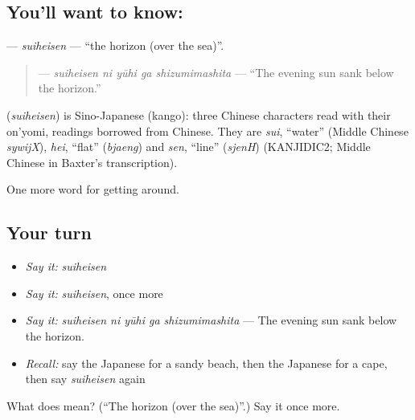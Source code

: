 \subsection*{You'll want to know: }
\textbf{} — \emph{suiheisen} — \textquotedblleft{}the horizon (over the sea)\textquotedblright{}.

\begin{quote}
\textbf{  } — \emph{suiheisen ni yūhi ga shizumimashita} — \textquotedblleft{}The evening sun sank below the horizon.\textquotedblright{}
\end{quote}

\begin{cousinweb}
\textbf{} (\emph{suiheisen}) is Sino-Japanese (kango): three Chinese characters read with their on'yomi, readings borrowed from Chinese. They are \emph{sui}, \textquotedblleft{}water\textquotedblright{} (Middle Chinese \emph{sywijX}), \emph{hei}, \textquotedblleft{}flat\textquotedblright{} (\emph{bjaeng}) and \emph{sen}, \textquotedblleft{}line\textquotedblright{} (\emph{sjenH}) (KANJIDIC2; Middle Chinese in Baxter's transcription).
\end{cousinweb}

\begin{grammarlens}[title={What you've built}]
One more word for getting around.
\end{grammarlens}

\subsection*{Your turn}
\begin{itemize}
\raggedright
  \item \emph{Say it:} \emph{suiheisen}
  \item \emph{Say it:} \emph{suiheisen}, once more
  \item \emph{Say it:} \emph{suiheisen ni yūhi ga shizumimashita} — The evening sun sank below the horizon.
  \item \emph{Recall:} say the Japanese for a sandy beach, then the Japanese for a cape, then say \emph{suiheisen} again
\end{itemize}

\begin{tcolorbox}[breakable,colback=teal!4,colframe=teal!35!black,title={Before you move on}]
What does  mean? (\textquotedblleft{}The horizon (over the sea)\textquotedblright{}.) Say it once more.
\end{tcolorbox}
